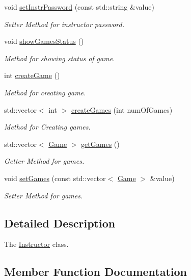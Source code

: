 \begin{DoxyCompactItemize}
void \hyperlink{classInstructor_a3df5460820d53f016f7e92a37ca70de9}{set\+Instr\+Password} (const std\+::string \&value)
\begin{DoxyCompactList}\small\item\em Setter Method for instructor password. \end{DoxyCompactList}\item 
void \hyperlink{classInstructor_a94f9564009326b43a3029fd3419e467b}{show\+Games\+Status} ()
\begin{DoxyCompactList}\small\item\em Method for showing status of game. \end{DoxyCompactList}\item 
int \hyperlink{classInstructor_a9fca4b1272f062d14ffb5bb89b10b6f8}{create\+Game} ()
\begin{DoxyCompactList}\small\item\em Method for creating game. \end{DoxyCompactList}\item 
std\+::vector$<$ int $>$ \hyperlink{classInstructor_afe6b1a0378d5324e9fb2c2d253cf964a}{create\+Games} (int num\+Of\+Games)
\begin{DoxyCompactList}\small\item\em Method for Creating games. \end{DoxyCompactList}\item 
std\+::vector$<$ \hyperlink{classGame}{Game} $>$ \hyperlink{classInstructor_ad3d7b1236562817ef13339bebed4e2d6}{get\+Games} ()
\begin{DoxyCompactList}\small\item\em Getter Method for games. \end{DoxyCompactList}\item 
void \hyperlink{classInstructor_a282cf5e300e5f642935d389b94f93b13}{set\+Games} (const std\+::vector$<$ \hyperlink{classGame}{Game} $>$ \&value)
\begin{DoxyCompactList}\small\item\em Setter Method for games. \end{DoxyCompactList}\end{DoxyCompactItemize}


\subsection{Detailed Description}
The \hyperlink{classInstructor}{Instructor} class. 

\subsection{Member Function Documentation}
\mbox{\label{classInstructor_a9fca4b1272f062d14ffb5bb89b10b6f8}} 
